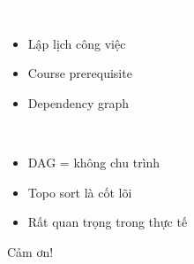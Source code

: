 \documentclass{beamer}
\newcommand{\hlorange}[1]{\textcolor{myorange}{#1}}
\newcommand{\hlwhite}[1]{\textcolor{white}{#1}}
\begin{document}

\begin{frame}{\hlwhite{Ứng dụng}}
\begin{itemize}
\item Lập lịch công việc
\item Course prerequisite
\item Dependency graph
\end{itemize}
\end{frame}


\begin{frame}{\hlwhite{Kết luận}}
\begin{itemize}
\item DAG = không chu trình
\item Topo sort là cốt lõi
\item Rất quan trọng trong thực tế
\end{itemize}

\centerline{\hlorange{Cảm ơn!}}
\end{frame}
\end{document}
